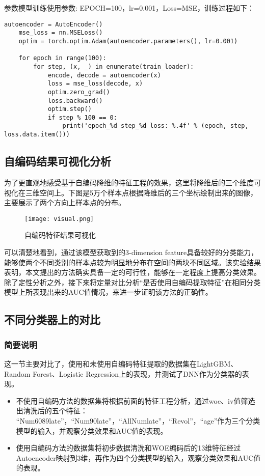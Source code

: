 参数模型训练使用参数: EPOCH=100，lr=0.001，Loss=MSE，训练过程如下：
\begin{lstlisting}[frame=shadowbox]
    autoencoder = AutoEncoder()
    mse_loss = nn.MSELoss()
    optim = torch.optim.Adam(autoencoder.parameters(), lr=0.001)

    for epoch in range(100):
        for step, (x, _) in enumerate(train_loader):
            encode, decode = autoencoder(x)
            loss = mse_loss(decode, x)
            optim.zero_grad()
            loss.backward()
            optim.step()
            if step % 100 == 0:
                print('epoch_%d step_%d loss: %.4f' % (epoch, step, loss.data.item()))
\end{lstlisting}

\subsection{自编码结果可视化分析}
为了更直观地感受基于自编码降维的特征工程的效果，这里将降维后的三个维度可视化在三维空间上。下图是5万个样本点根据降维后的三个坐标绘制出来的图像，主要展示了两个方向上样本点的分布。

\begin{figure}[H]
    \centering
    \texttt{[image: visual.png]}
    \caption{自编码特征结果可视化}
    \label{fig:visual}
\end{figure}

可以清楚地看到，通过该模型获取到的3-dimension feature具备较好的分类能力，能够使两个不同类别的样本点较为明显地分布在空间的两块不同区域。该实验结果表明，本文提出的方法确实具备一定的可行性，能够在一定程度上提高分类效果。\\

除了定性分析之外，接下来将定量对比分析“是否使用自编码提取特征”在相同分类模型上所表现出来的AUC值情况，来进一步证明该方法的正确性。

\subsection{不同分类器上的对比}
\subsubsection{简要说明}
这一节主要对比了，使用和未使用自编码特征提取的数据集在LightGBM、Random Forest、Logistic Regression上的表现，并测试了DNN作为分类器的表现。

\begin{itemize}
    \item 不使用自编码方法的数据集将根据前面的特征工程分析，通过woe、iv值筛选出清洗后的五个特征： “Num6089late”，“Num90late”，“AllNumlate”，“Revol”，“age”作为三个分类模型的输入，并观察分类效果和AUC值的表现。
    \item 使用自编码方法的数据集将初步数据清洗和WOE编码后的13维特征经过Autoencoder映射到3维，再作为四个分类模型的输入，观察分类效果和AUC值的表现。
\end{itemize}

